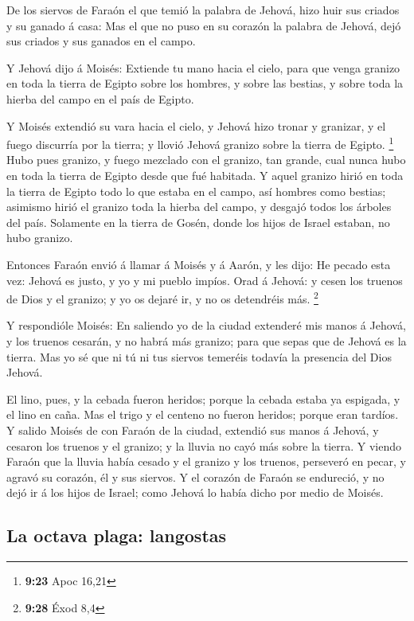  De los siervos de Faraón el que temió la palabra de
Jehová, hizo huir sus criados y su ganado á casa:  Mas el
que no puso en su corazón la palabra de Jehová, dejó sus criados y sus
ganados en el campo.

 Y Jehová dijo á Moisés: Extiende tu mano hacia el cielo,
para que venga granizo en toda la tierra de Egipto sobre los hombres, y
sobre las bestias, y sobre toda la hierba del campo en el país de
Egipto.

 Y Moisés extendió su vara hacia el cielo, y Jehová hizo
tronar y granizar, y el fuego discurría por la tierra; y llovió Jehová
granizo sobre la tierra de Egipto. \footnote{\textbf{9:23} Apoc 16,21}
 Hubo pues granizo, y fuego mezclado con el granizo, tan
grande, cual nunca hubo en toda la tierra de Egipto desde que fué
habitada.  Y aquel granizo hirió en toda la tierra de
Egipto todo lo que estaba en el campo, así hombres como bestias;
asimismo hirió el granizo toda la hierba del campo, y desgajó todos los
árboles del país.  Solamente en la tierra de Gosén, donde
los hijos de Israel estaban, no hubo granizo.

 Entonces Faraón envió á llamar á Moisés y á Aarón, y les
dijo: He pecado esta vez: Jehová es justo, y yo y mi pueblo impíos.
 Orad á Jehová: y cesen los truenos de Dios y el granizo; y
yo os dejaré ir, y no os detendréis más. \footnote{\textbf{9:28} Éxod
  8,4}

 Y respondióle Moisés: En saliendo yo de la ciudad
extenderé mis manos á Jehová, y los truenos cesarán, y no habrá más
granizo; para que sepas que de Jehová es la tierra.  Mas yo
sé que ni tú ni tus siervos temeréis todavía la presencia del Dios
Jehová.

 El lino, pues, y la cebada fueron heridos; porque la
cebada estaba ya espigada, y el lino en caña.  Mas el trigo
y el centeno no fueron heridos; porque eran tardíos.  Y
salido Moisés de con Faraón de la ciudad, extendió sus manos á Jehová, y
cesaron los truenos y el granizo; y la lluvia no cayó más sobre la
tierra.  Y viendo Faraón que la lluvia había cesado y el
granizo y los truenos, perseveró en pecar, y agravó su corazón, él y sus
siervos.  Y el corazón de Faraón se endureció, y no dejó ir
á los hijos de Israel; como Jehová lo había dicho por medio de Moisés.

\hypertarget{la-octava-plaga-langostas}{%
\subsection{La octava plaga:
langostas}\label{la-octava-plaga-langostas}}

